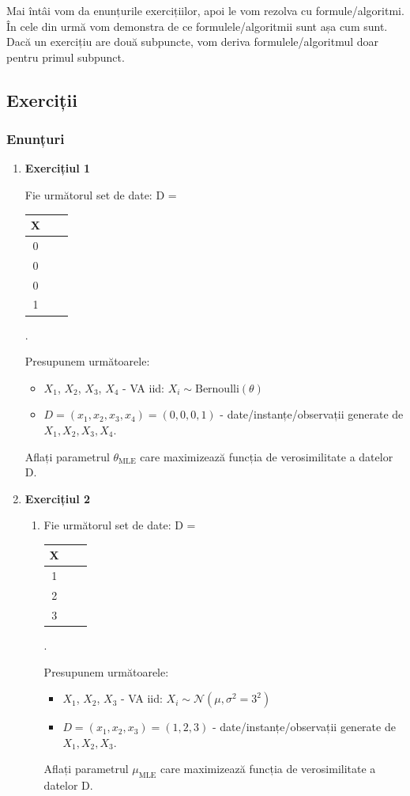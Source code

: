 \documentclass[12pt]{article}
\begin{document}
	Mai întâi vom da enunțurile exercițiilor, apoi le vom rezolva cu formule/algoritmi. În cele din urmă vom demonstra de ce formulele/algoritmii sunt așa cum sunt. Dacă un exercițiu are două subpuncte, vom deriva formulele/algoritmul doar pentru primul subpunct.
	
	\newpage
	
	\subsection{Exerciții}
	\subsubsection{Enunțuri}
	\begin{enumerate}
		\item \textbf{Exercițiul 1}
		
		Fie următorul set de date: D =
		\begin{tabular}{ |c|c|c| } 
			\hline
			X \\ 
			\hline
			0 \\ 
			0 \\ 
			0 \\
			1\\
			\hline
		\end{tabular}. 
	
	Presupunem următoarele:
	\begin{itemize}
		\item $X_1$, $X_2$, $X_3$, $X_4$ - VA iid: $X_i \sim \text{Bernoulli}(\theta)$
		\item $D=(x_1,x_2,x_3,x_4) = (0,0,0,1)$ - date/instanțe/observații generate de $X_1,X_2,X_3,X_4$.
	\end{itemize}
	Aflați parametrul $\theta_\text{MLE}$ care maximizează funcția de verosimilitate a datelor D.
		\item \textbf{Exercițiul 2}
		\begin{enumerate}
			\item 		Fie următorul set de date: D =
			\begin{tabular}{ |c|c|c| } 
				\hline
				X \\ 
				\hline
				1 \\ 
				2 \\ 
				3 \\
				\hline
			\end{tabular}. 
			
			Presupunem următoarele:
			\begin{itemize}
				\item $X_1$, $X_2$, $X_3$ - VA iid: $X_i \sim \mathcal{N}(\mu,\sigma^2=3^2)$
				\item $D=(x_1,x_2,x_3) = (1,2,3)$ - date/instanțe/observații generate de $X_1,X_2,X_3$.
			\end{itemize}
			Aflați parametrul $\mu_\text{MLE}$ care maximizează funcția de verosimilitate a datelor D.
			

\end{enumerate}
\end{enumerate}
\end{document}
